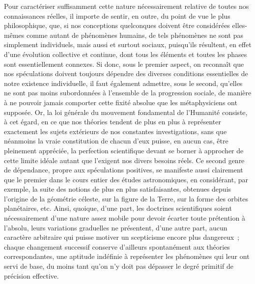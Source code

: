 \documentclass[french,twoside]{book} %
\begin{document}
Pour caractériser suffisamment cette nature nécessairement relative de toutes nos connaissances réelles, il importe de sentir, en outre, du point de vue le plus philosophique, que, si nos conceptions quelconques doivent être considérées elles-mêmes comme autant de phénomènes humains, de tels phénomènes ne sont pas simplement individuels, mais aussi et surtout sociaux, puisqu’ils résultent, en effet d’une évolution collective et continue, dont tous les éléments et toutes les phases sont essentiellement connexes. Si donc, sous le premier aspect, on reconnaît que nos spéculations doivent toujours dépendre des diverses conditions essentielles de notre existence individuelle, il faut également admettre, sous le second, qu’elles ne sont pas moins subordonnées à l’ensemble de la progression sociale, de manière à ne pouvoir jamais comporter cette fixité absolue que les métaphysiciens ont supposée. Or, la loi générale du mouvement fondamental de l’Humanité consiste, à cet égard, en ce que nos théories tendent de plus en plus à représenter exactement les sujets extérieurs de nos constantes investigations, sans que néanmoins la vraie constitution de chacun d’eux puisse, en aucun cas, être pleinement appréciée, la perfection scientifique devant se borner à approcher de cette limite idéale autant que l’exigent nos divers besoins réels. Ce second genre de dépendance, propre aux spéculations positives, se manifeste aussi clairement que le premier dans le cours entier des études astronomiques, en considérant, par exemple, la suite des notions de plus en plus satisfaisantes, obtenues depuis l’origine de la géométrie céleste, sur la figure de la Terre, sur la forme des orbites planétaires, etc. Ainsi, quoique, d’une part, les doctrines scientifiques soient nécessairement d’une nature assez mobile pour devoir écarter toute prétention à l’absolu, leurs variations graduelles ne présentent, d’une autre part, aucun caractère arbitraire qui puisse motiver un scepticisme encore plus dangereux ; chaque changement successif conserve d’ailleurs spontanément aux théories correspondantes, une aptitude indéfinie à représenter les phénomènes qui leur ont servi de base, du moins tant qu’on n’y doit pas dépasser le degré primitif de précision effective.\par
\end{document}
